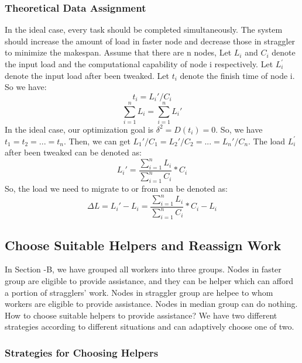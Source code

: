 \subsubsection{Theoretical Data Assignment}

  In the ideal case, every task should be completed simultaneously. The system should increase the amount of load in faster node and decrease those in straggler to minimize the makespan. Assume that there are n nodes, Let \emph{$L_i$} and \emph{$C_i$} denote the input load and the computational capability of node i respectively. Let \emph{$L_i^\prime$} denote the input load after been tweaked. Let $t_i$ denote the finish time of node i. So we have:
  \begin{equation}
  t_i = L_i\prime / C_i
  \end{equation}
  \begin{equation}
  \sum_{i=1}^n L_i = \sum_{i=1}^n L_i\prime
  \end{equation}
  In the ideal case, our optimization goal is $\delta^{2}=D(t_i)=0$. So, we have $t_1=t_2=...=t_n$. Then, we can get $L_1\prime/C_1=L_2\prime/C_2=...=L_n\prime/C_n$. The load \emph{$L_i^\prime$} after been tweaked can be denoted as:
  \begin{equation}
  L_i\prime =  \frac{\sum_{i=1}^n L_i}{\sum_{i=1}^n C_i}*C_i
  \end{equation}
  So, the load we need to migrate to or from can be denoted as:
  \begin{equation}
  \Delta L = L_i\prime - L_i = \frac{\sum_{i=1}^n L_i}{\sum_{i=1}^n C_i}*C_i - L_i
  \end{equation}

\subsection{Choose Suitable Helpers and Reassign Work}

  In Section \uppercase\expandafter{}-B, we have grouped all workers into three groups. Nodes in faster group are eligible to provide assistance, and they can be helper which can afford a portion of stragglers' work. Nodes in straggler group are helpee to whom workers are eligible to provide assistance. Nodes in median group can do nothing. How to choose suitable helpers to provide assistance? We have two different strategies according to different situations and can adaptively choose one of two.

\subsubsection{Strategies for Choosing Helpers}

